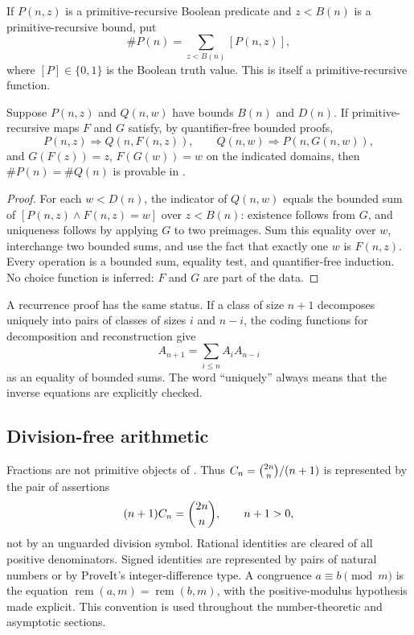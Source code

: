 \begin{definition}
If $P(n,z)$ is a primitive-recursive Boolean predicate and $z<B(n)$ is a
primitive-recursive bound, put
\[
  \#P(n)=\sum_{z<B(n)}[P(n,z)],
\]
where $[P]\in\{0,1\}$ is the Boolean truth value.  This is itself a
primitive-recursive function.
\end{definition}

\begin{lemma}
\label{lem:finite-bijection}
Suppose $P(n,z)$ and $Q(n,w)$ have bounds $B(n)$ and $D(n)$.  If
primitive-recursive maps $F$ and $G$ satisfy, by quantifier-free bounded
proofs,
\[
 P(n,z)\Rightarrow Q(n,F(n,z)),\qquad
 Q(n,w)\Rightarrow P(n,G(n,w)),
\]
and $G(F(z))=z$, $F(G(w))=w$ on the indicated domains, then
$\#P(n)=\#Q(n)$ is provable in \ipra.
\end{lemma}

\begin{proof}
For each $w<D(n)$, the indicator of $Q(n,w)$ equals the bounded sum of
$[P(n,z)\wedge F(n,z)=w]$ over $z<B(n)$: existence follows from $G$, and
uniqueness follows by applying $G$ to two preimages.  Sum this equality over
$w$, interchange two bounded sums, and use the fact that exactly one $w$ is
$F(n,z)$.  Every operation is a bounded sum, equality test, and
quantifier-free induction.  No choice function is inferred: $F$ and $G$ are
part of the data.
\end{proof}

A recurrence proof has the same status.  If a class of size $n+1$ decomposes
uniquely into pairs of classes of sizes $i$ and $n-i$, the coding functions
for decomposition and reconstruction give
\[
  A_{n+1}=\sum_{i\le n}A_iA_{n-i}
\]
as an equality of bounded sums.  The word ``uniquely'' always means that the
inverse equations are explicitly checked.

\subsection{Division-free arithmetic}

Fractions are not primitive objects of \ipra.  Thus
\(C_n=\binom{2n}{n}/(n+1)\) is represented by the pair of assertions
\[
  (n+1)C_n=\binom{2n}{n},\qquad n+1>0,
\]
not by an unguarded division symbol.  Rational identities are cleared of all
positive denominators.  Signed identities are represented by pairs of natural
numbers or by ProveIt's integer-difference type.  A congruence
$a\equiv b\pmod m$ is the equation $\operatorname{rem}(a,m)=
\operatorname{rem}(b,m)$, with the positive-modulus hypothesis made explicit.
This convention is used throughout the number-theoretic and asymptotic
sections.

